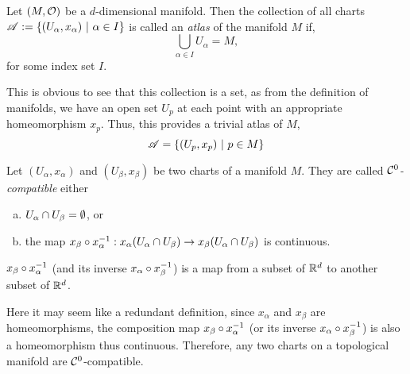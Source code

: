 \begin{definition}[Atlas]\label{def:atlas}
	Let \((M, \mathcal{O})\) be a \(d\)-dimensional manifold. Then the collection of all charts \(\mathscr{A} := \qty{(U_\alpha, x_\alpha) \ \middle|\ \alpha \in I}\) is called an \emph{atlas} of the manifold \(M\) if,
	\begin{equation}
		\bigcup_{\alpha \in I} U_\alpha = M,
	\end{equation}
	for some index set \(I\).
\end{definition}

This is obvious to see that this collection is a set, as from the definition of manifolds, we have an open set \(U_p\) at each point with an appropriate homeomorphism \(x_p\). Thus, this provides a trivial atlas of \(M\),
\begin{equation}
	\mathscr{A} = \qty{(U_p, x_p) \ \middle|\ p \in M}
\end{equation}

\begin{definition}[\(\SC^0\)-Compatibility]
	Let \((U_\alpha, x_\alpha)\) and \((U_\beta, x_\beta)\) be two charts of a manifold \(M\). They are called \emph{\(\SC^0\)-compatible} either
	\begin{enumerate}[(a)]
		\item \(U_\alpha \cap U_\beta = \emptyset\), or
		\item the map \(x_{\beta} \circ x_{\alpha}^{-1}: x_{\alpha}(U_{\alpha} \cap U_{\beta}) \to x_{\beta}(U_{\alpha} \cap U_{\beta})\) is continuous.
	\end{enumerate}
\end{definition}

\(x_{\beta} \circ x_{\alpha}^{-1}\) (and its inverse \(x_{\alpha} \circ x_{\beta}^{-1}\)) is a map from a subset of \(\mathbb R^d\) to another subset of \(\mathbb R^d\).
\begin{figure}[H]
	\centering
\end{figure} \noindent

Here it may seem like a redundant definition, since \(x_{\alpha}\) and \(x_{\beta}\) are homeomorphisms, the composition map \(x_{\beta} \circ x_{\alpha}^{-1}\) (or its inverse \(x_{\alpha} \circ x_{\beta}^{-1}\)) is also a homeomorphism thus continuous. Therefore, any two charts on a topological manifold are \(\SC^0\)-compatible.

